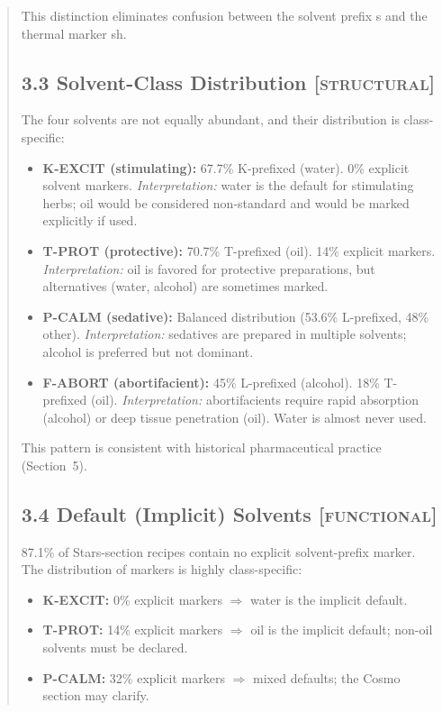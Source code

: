 \documentclass[11pt,a4paper]{article}
\begin{document}
\begin{abstract}
This distinction eliminates confusion between the solvent prefix s and the thermal marker sh.

\subsection*{3.3 Solvent-Class Distribution \textsc{[structural]}}

The four solvents are not equally abundant, and their distribution is class-specific:

\begin{itemize}
\item \textbf{K-EXCIT (stimulating):} 67.7\% K-prefixed (water). 0\% explicit solvent markers. \textit{Interpretation:} water is the default for stimulating herbs; oil would be considered non-standard and would be marked explicitly if used.

\item \textbf{T-PROT (protective):} 70.7\% T-prefixed (oil). 14\% explicit markers. \textit{Interpretation:} oil is favored for protective preparations, but alternatives (water, alcohol) are sometimes marked.

\item \textbf{P-CALM (sedative):} Balanced distribution (53.6\% L-prefixed, 48\% other). \textit{Interpretation:} sedatives are prepared in multiple solvents; alcohol is preferred but not dominant.

\item \textbf{F-ABORT (abortifacient):} 45\% L-prefixed (alcohol). 18\% T-prefixed (oil). \textit{Interpretation:} abortifacients require rapid absorption (alcohol) or deep tissue penetration (oil). Water is almost never used.

\end{itemize}

This pattern is consistent with historical pharmaceutical practice (Section~5).

\subsection*{3.4 Default (Implicit) Solvents \textsc{[functional]}}

87.1\% of Stars-section recipes contain no explicit solvent-prefix marker. The distribution of markers is highly class-specific:

\begin{itemize}
\item \textbf{K-EXCIT:} 0\% explicit markers $\Rightarrow$ water is the implicit default.
\item \textbf{T-PROT:} 14\% explicit markers $\Rightarrow$ oil is the implicit default; non-oil solvents must be declared.
\item \textbf{P-CALM:} 32\% explicit markers $\Rightarrow$ mixed defaults; the Cosmo section may clarify.
\end{itemize}


\end{abstract}
\end{document}
